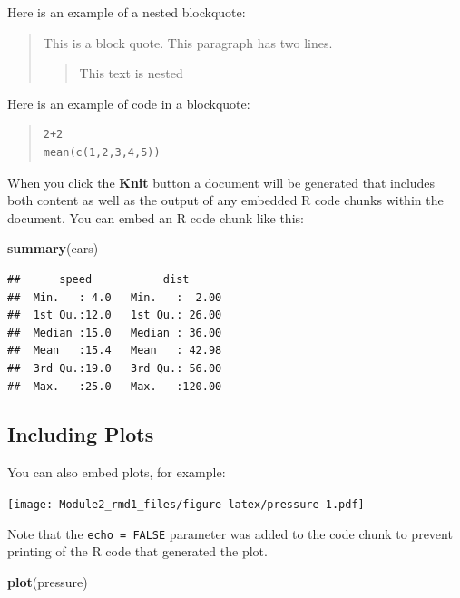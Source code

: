 \documentclass[
]{article}
\newenvironment{Shaded}{\begin{snugshade}}{\end{snugshade}}
\newcommand{\KeywordTok}[1]{\textcolor[rgb]{0.13,0.29,0.53}{\textbf{#1}}}
\newcommand{\NormalTok}[1]{#1}
\begin{document}
Here is an example of a nested blockquote:

\begin{quote}
This is a block quote. This paragraph has two lines.

\begin{quote}
This text is nested
\end{quote}
\end{quote}

Here is an example of code in a blockquote:

\begin{quote}
\begin{verbatim}
2+2
mean(c(1,2,3,4,5))
\end{verbatim}
\end{quote}

When you click the \textbf{Knit} button a document will be generated
that includes both content as well as the output of any embedded R code
chunks within the document. You can embed an R code chunk like this:

\begin{Shaded}
\begin{Highlighting}[]
\KeywordTok{summary}\NormalTok{(cars)}
\end{Highlighting}
\end{Shaded}

\begin{verbatim}
##      speed           dist       
##  Min.   : 4.0   Min.   :  2.00  
##  1st Qu.:12.0   1st Qu.: 26.00  
##  Median :15.0   Median : 36.00  
##  Mean   :15.4   Mean   : 42.98  
##  3rd Qu.:19.0   3rd Qu.: 56.00  
##  Max.   :25.0   Max.   :120.00
\end{verbatim}

\hypertarget{including-plots}{%
\subsection{Including Plots}\label{including-plots}}

You can also embed plots, for example:

\texttt{[image: Module2\_rmd1\_files/figure-latex/pressure-1.pdf]}

Note that the \texttt{echo\ =\ FALSE} parameter was added to the code
chunk to prevent printing of the R code that generated the plot.

\begin{Shaded}
\begin{Highlighting}[]
\KeywordTok{plot}\NormalTok{(pressure)}
\end{Highlighting}
\end{Shaded}
\end{document}
